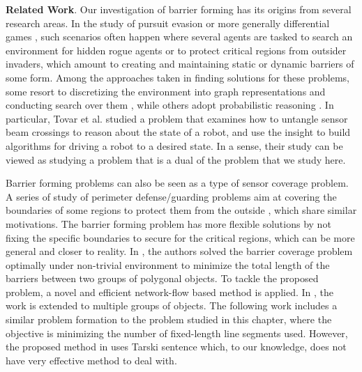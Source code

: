 \noindent\textbf{Related Work}.
Our investigation of barrier forming has its origins from several research areas.
In the study of pursuit evasion or more generally differential games \cite{ho1965differential,isaacs1999differential,hajek2008pursuit,tovar2009sensor,simov2000pursuit,guibas1997visibility,kameda2006online,kirousis1986searching, sachs2004visibility,lau2005optimal, yu2011shadow, olsen2022robust}, 
such scenarios often happen where several agents are tasked to search an environment for hidden rogue agents or to protect critical regions from outsider invaders, which amount to creating and maintaining static or dynamic barriers of some form.  
%
Among the approaches taken in finding solutions for these problems, some resort to discretizing the environment into graph representations and conducting search over them \cite{kirousis1986searching, sachs2004visibility}, while others adopt probabilistic reasoning \cite{lau2005optimal, yu2011shadow}. 
%
In particular, Tovar et al. \cite{tovar2009sensor} studied a problem that examines how to untangle sensor beam crossings to reason about the state of a robot, and use the insight to build algorithms for driving a robot to a desired state. In a sense, their study can be viewed as studying a problem that is a dual of the problem that we study here. 


Barrier forming problems can also be seen as a type of sensor coverage problem. 
%
A series of study of perimeter defense/guarding problems aim at covering the boundaries of some regions to protect them from the outside \cite{shishika2020cooperative, macharet2020adaptive, fenghangaoyu2019efficient, fengyu2020optimally}, which share similar motivations. 
The barrier forming problem has more flexible solutions by not fixing the specific boundaries to secure for the critical regions,
which can be more general and closer to reality.
In \cite{kloder2007barrier}, the authors solved the barrier coverage problem optimally under non-trivial environment to minimize the total length of the barriers between two groups of polygonal objects. 
To tackle the proposed problem, a novel and efficient network-flow based method is applied. 
In \cite{abrahamsen2020geometric}, the work is extended to multiple groups of objects.
The following work \cite{kloder2008thesis} includes a similar problem formation to the problem studied in this chapter, where the objective is minimizing the number of fixed-length line segments used. 
%
However, the proposed method in \cite{kloder2008thesis} uses Tarski sentence \cite{tarski1949decision} which, to our knowledge, does not have very effective method to deal with.

